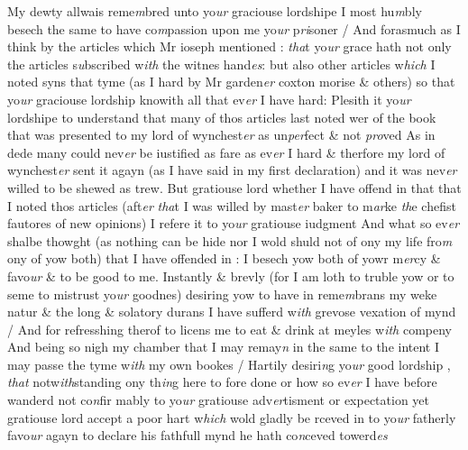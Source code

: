 \documentclass[12pt, a4paper]{book}
\begin{document}
            			My dewty allwais reme\textit{m}bred unto yo\textit{ur} graciouse lordshipe I most hu\textit{m}bly
besech the same to have co\textit{m}passion upon me yo\textit{ur }p\textit{ri}soner / And forasmuch
            			as I think by the articles which Mr ioseph mentioned : \textit{tha}t yo\textit{ur} grace
hath not only the articles s\textit{u}bscribed w\textit{ith} the witnes hand\textit{es}: but also
other articles w\textit{hich} I noted syns that tyme (as I hard by Mr garden\textit{er}
            			coxton morise \& others) so that yo\textit{ur} graciouse lordship knowith all that 
            			ev\textit{er }I have hard: Plesith it yo\textit{ur} lordshipe to understand that many
of thos articles last noted wer of the book that was presented
 to my lord of wynchest\textit{er} as un\textit{per}fect \& not \textit{pro}ved As in dede many could 
nev\textit{er} be iustified as fare as ev\textit{er} I hard \& therfore my lord of wynchest\textit{er}
sent it agayn (as I have said in my first declaration) and it was
nev\textit{er} willed to be shewed as trew. But gratiouse lord whether I have
offend in that that I noted thos articles (aft\textit{er}
               \textit{tha}t I was willed by 
            			mast\textit{er} baker to m\textit{ar}ke \textit{th}e chefist fautores of new opinions) I refere
it to yo\textit{ur} gratiouse iudgment And what so ev\textit{er} shalbe thowght (as
nothing can be hide nor I wold shuld not of ony my life fro\textit{m} ony
of yow both) that I have offended in : I besech yow both of yowr
m\textit{er}cy \& favo\textit{ur} \& to be good to me. Instantly \& brevly (for I am loth
to truble yow or to seme to mistrust yo\textit{ur }goodnes) desiring yow
to have in reme\textit{m}brans my weke natur \& the long \& solatory
durans I have sufferd w\textit{ith} grevose vexation of mynd / And for
refresshing therof to licens me to eat \& drink at meyles w\textit{ith}
compeny And being so nigh my chamber that I may remay\textit{n}
in the same to the intent I may passe the tyme w\textit{ith} my own 
            			bookes / Hartily desiri\textit{n}g yo\textit{ur} good lordship
			, \textit{that} notw\textit{ith}standing ony th\textit{in}g here
to fore done or how so ev\textit{er} I have before wanderd not co\textit{n}fir           			mably to yo\textit{ur} gratiouse adv\textit{er}tisment or expectation yet gratiouse lord
accept a poor hart w\textit{hich} wold gladly be rceved in to yo\textit{ur} fatherly
favo\textit{ur} agayn to declare his fathfull mynd he hath co\textit{n}ceved towerd\textit{es}
\end{document}
